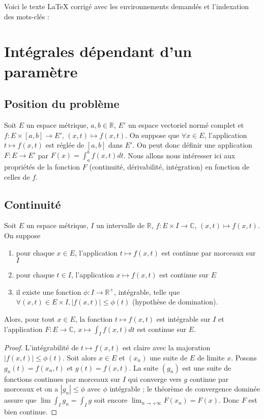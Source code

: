Voici le texte LaTeX corrigé avec les environnements demandés et l'indexation des mots-clés :

\section{Intégrales dépendant d'un paramètre}

\subsection{Position du problème}

Soit $E$ un espace métrique, $a,b \in \mathbb{R}$, $E'$ un espace vectoriel normé complet et $f : E \times [a,b] \to E'$, $(x,t) \mapsto f(x,t)$. On suppose que $\forall x \in E$, l'application $t \mapsto f(x,t)$ est réglée de $[a,b]$ dans $E'$. On peut donc définir une application $F : E \to E'$ par $F(x) = \int_a^b f(x,t) dt$. Nous allons nous intéresser ici aux propriétés de la fonction $F$ (continuité, dérivabilité, intégration) en fonction de celles de $f$.

\subsection{Continuité}

\begin{thm}
Soit $E$ un espace métrique, $I$ un intervalle de $\mathbb{R}$, $f : E \times I \to \mathbb{C}$, $(x,t) \mapsto f(x,t)$. On suppose
\begin{enumerate}
  \item pour chaque $x \in E$, l'application $t \mapsto f(x,t)$ est continue par morceaux sur $I$
  \item pour chaque $t \in I$, l'application $x \mapsto f(x,t)$ est continue sur $E$
  \item il existe une fonction $\phi : I \to \mathbb{R}^+$, intégrable, telle que $\forall (x,t) \in E \times I, |f(x,t)| \leq \phi(t)$ (hypothèse de domination).
\end{enumerate}
Alors, pour tout $x \in E$, la fonction $t \mapsto f(x,t)$ est intégrable sur $I$ et l'application $F : E \to \mathbb{C}$, $x \mapsto \int_I f(x,t) dt$ est continue sur $E$.
\end{thm}

\begin{proof}
L'intégrabilité de $t \mapsto f(x,t)$ est claire avec la majoration $|f(x,t)| \leq \phi(t)$. Soit alors $x \in E$ et $(x_n)$ une suite de $E$ de limite $x$. Posons $g_n(t) = f(x_n,t)$ et $g(t) = f(x,t)$. La suite $(g_n)$ est une suite de fonctions continues par morceaux sur $I$ qui converge vers $g$ continue par morceaux et on a $|g_n| \leq \phi$ avec $\phi$ intégrable ; le théorème de convergence dominée assure que $\lim \int_I g_n = \int_I g$ soit encore $\lim_{n \to +\infty} F(x_n) = F(x)$. Donc $F$ est bien continue.
\end{proof}

